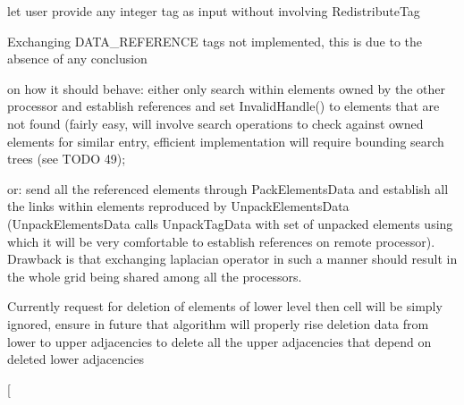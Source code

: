 \begin{DoxyRefList}
\begin{DoxyEnumerate}
\item let user provide any integer tag as input without involving Redistribute\-Tag 
\end{DoxyEnumerate}
\item[\label{todo__todo000013}%
\hypertarget{todo__todo000013}{}%
Member \hyperlink{classINMOST_1_1Mesh_a2d488479041917c975b1e662d642c4a5}{I\-N\-M\-O\-S\-T\-:\-:Mesh\-:\-:Reduce\-Data} (const Tag \&tag, Element\-Type mask, Marker\-Type select, Reduce\-Operation op)]
\begin{DoxyEnumerate}
\item Exchanging D\-A\-T\-A\-\_\-\-R\-E\-F\-E\-R\-E\-N\-C\-E tags not implemented, this is due to the absence of any conclusion
\end{DoxyEnumerate}
\begin{DoxyItemize}
\item on how it should behave\-: either only search within elements owned by the other processor and establish references and set Invalid\-Handle() to elements that are not found (fairly easy, will involve search operations to check against owned elements for similar entry, efficient implementation will require bounding search trees (see T\-O\-D\-O 49);
\item or\-: send all the referenced elements through Pack\-Elements\-Data and establish all the links within elements reproduced by Unpack\-Elements\-Data (Unpack\-Elements\-Data calls Unpack\-Tag\-Data with set of unpacked elements using which it will be very comfortable to establish references on remote processor). Drawback is that exchanging laplacian operator in such a manner should result in the whole grid being shared among all the processors. 
\end{DoxyItemize}
\item[\label{todo__todo000010}%
\hypertarget{todo__todo000010}{}%
Member \hyperlink{classINMOST_1_1Mesh_a5cb95f1e8d6b7987496fc8276c86cf3a}{I\-N\-M\-O\-S\-T\-:\-:Mesh\-:\-:Remove\-Ghost\-Elements} (const Handle\-Type $\ast$ghost, enumerator num)]
\begin{DoxyEnumerate}
\item Currently request for deletion of elements of lower level then cell will be simply ignored, ensure in future that algorithm will properly rise deletion data from lower to upper adjacencies to delete all the upper adjacencies that depend on deleted lower adjacencies  
\end{DoxyEnumerate}
\item[\label{todo__todo000016}%
\hypertarget{todo__todo000016}{}%

\end{DoxyRefList}
